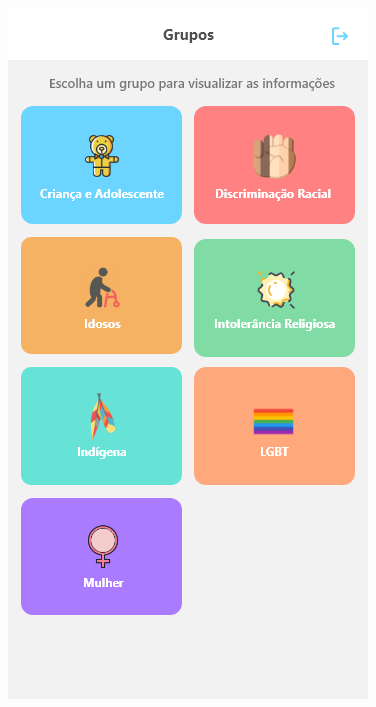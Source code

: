 \documentclass[
	12pt,				%
	openright,			%
	oneside,			%
	a4paper,			%
	english,			%
	brazil,				%
	]{abntex2}
\theoremstyle{theorem}
\theoremstyle{definition}
\begin{document}
\begin{figure}[H]
\centering
\begin{minipage}{.3\textwidth}
      \centering
    \includegraphics[width=.9\linewidth]{imagens/prototipoInicio.png}
    \label{fig: Tela inicial}
\end{minipage}
\begin{minipage}{.3\textwidth}
  \centering

\end{minipage}
\end{figure}
\end{document}
